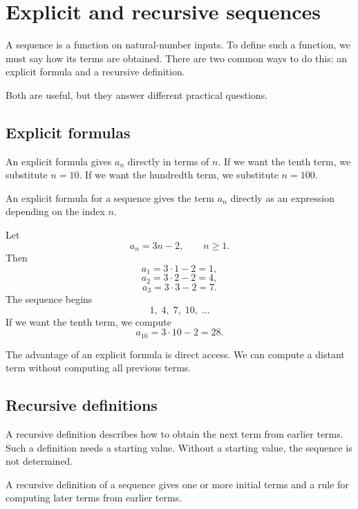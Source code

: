 \section{Explicit and recursive sequences}

A sequence is a function on natural-number inputs. To define such a function, we must say how its terms are obtained. There are two common ways to do this: an explicit formula and a recursive definition.

Both are useful, but they answer different practical questions.

\subsection*{Explicit formulas}

An explicit formula gives \(a_n\) directly in terms of \(n\). If we want the tenth term, we substitute \(n=10\). If we want the hundredth term, we substitute \(n=100\).

\begin{definitionbox}
An explicit formula for a sequence gives the term \(a_n\) directly as an expression depending on the index \(n\).
\end{definitionbox}

\begin{examplebox}
Let
\[
a_n=3n-2,
\qquad n\ge1.
\]
Then
\[
a_1=3\cdot1-2=1,
\]
\[
a_2=3\cdot2-2=4,
\]
\[
a_3=3\cdot3-2=7.
\]
The sequence begins
\[
1,\;4,\;7,\;10,\;\ldots
\]
If we want the tenth term, we compute
\[
a_{10}=3\cdot10-2=28.
\]
\end{examplebox}

The advantage of an explicit formula is direct access. We can compute a distant term without computing all previous terms.

\subsection*{Recursive definitions}

A recursive definition describes how to obtain the next term from earlier terms. Such a definition needs a starting value. Without a starting value, the sequence is not determined.

\begin{definitionbox}
A recursive definition of a sequence gives one or more initial terms and a rule for computing later terms from earlier terms.
\end{definitionbox}


